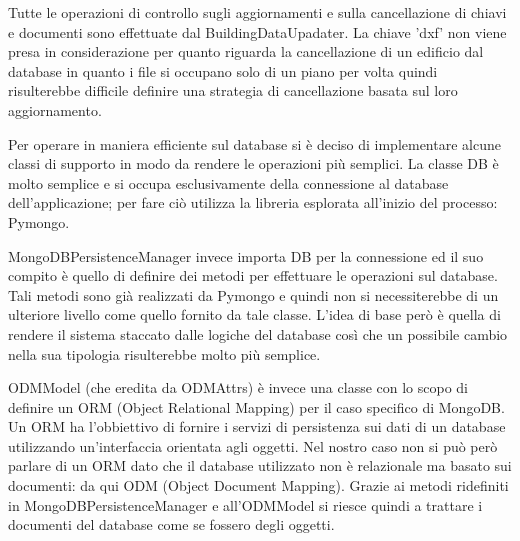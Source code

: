 \documentclass[12pt]{report}
\begin{document}
Tutte le operazioni di controllo sugli aggiornamenti e sulla cancellazione di chiavi e documenti sono effettuate dal BuildingDataUpadater.
La chiave 'dxf' non viene presa in considerazione per quanto riguarda la cancellazione di un edificio dal database in quanto i file si occupano solo di un piano per volta quindi risulterebbe difficile definire una strategia di cancellazione basata sul loro aggiornamento.    

\vspace{5mm} %

Per operare in maniera efficiente sul database si è deciso di implementare alcune classi di supporto in modo da rendere le operazioni più semplici.
La classe DB è molto semplice e si occupa esclusivamente della connessione al database dell'applicazione; per fare ciò utilizza la libreria esplorata all'inizio del processo: Pymongo.

MongoDBPersistenceManager invece importa DB per la connessione ed il suo compito è quello di definire dei metodi per effettuare le operazioni sul database.
Tali metodi sono già realizzati da Pymongo e quindi non si necessiterebbe di un ulteriore livello come quello fornito da tale classe.
L'idea di base però è quella di rendere il sistema staccato dalle logiche del database così che un possibile cambio nella sua tipologia risulterebbe molto più semplice.


ODMModel (che eredita da ODMAttrs) è invece una classe con lo scopo di definire un ORM (Object Relational Mapping) per il caso specifico di MongoDB.
Un ORM ha l'obbiettivo di fornire i servizi di persistenza sui dati di un database utilizzando un'interfaccia orientata agli oggetti.
Nel nostro caso non si può però parlare di un ORM dato che il database utilizzato non è relazionale ma basato sui documenti: da qui ODM (Object Document Mapping).
Grazie ai metodi ridefiniti in MongoDBPersistenceManager e all'ODMModel si riesce quindi a trattare i documenti del database come se fossero degli oggetti.
\end{document}
